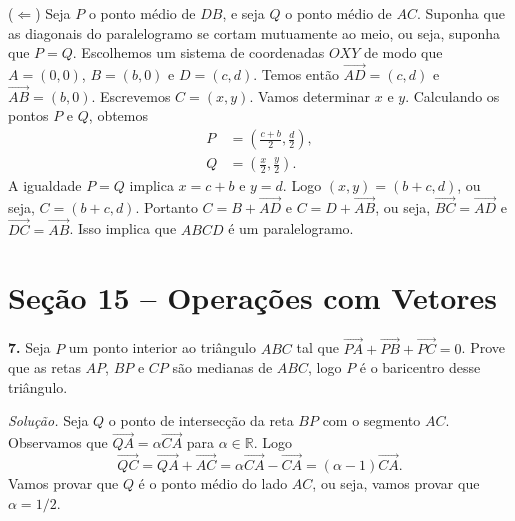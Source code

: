 \documentclass[a4paper,11pt]{article}
\newcommand{\R}{\mathbb{R}}
\begin{document}
($\Leftarrow$)
Seja $P$ o ponto médio de $DB$, e seja $Q$ o ponto médio de $AC$.
Suponha que as diagonais do paralelogramo se cortam mutuamente ao meio, ou seja, suponha que $P = Q$.
Escolhemos um sistema de coordenadas $OXY$ de modo que $A = (0,0)$, $B = (b,0)$ e $D = (c, d)$.
Temos então $\overrightarrow{AD} = (c,d)$ e $\overrightarrow{AB} = (b,0)$.
Escrevemos $C = (x,y)$.
Vamos determinar $x$ e $y$.
Calculando os pontos $P$ e $Q$, obtemos
\begin{align*}
  P & = \left( \frac{c+b}{2}, \frac{d}{2} \right), \\
  Q & = \left( \frac{x}{2}, \frac{y}{2} \right).
\end{align*}
A igualdade $P = Q$ implica $x = c + b$ e $y = d$.
Logo $(x,y) = (b + c, d)$, ou seja, $C = (b + c, d)$.
Portanto $C = B + \overrightarrow{AD}$ e $C = D + \overrightarrow{AB}$, ou seja, $\overrightarrow{BC} = \overrightarrow{AD}$ e $\overrightarrow{DC} = \overrightarrow{AB}$.
Isso implica que $ABCD$ é um paralelogramo.

\section*{Seção 15 -- Operações com Vetores}

\textbf{7.}
Seja $P$ um ponto interior ao triângulo $ABC$ tal que $\overrightarrow{PA} \!+\! \overrightarrow{PB} + \overrightarrow{PC} = 0$.
Prove que as retas $AP$, $BP$ e $CP$ são medianas de $ABC$, logo $P$ é o ba\-ri\-cen\-tro desse triângulo.

\vspace{\baselineskip}

\emph{Solução.}
Seja $Q$ o ponto de intersecção da reta $BP$ com o segmento $AC$.
Observamos que $\overrightarrow{QA} = \alpha \overrightarrow{CA}$ para $\alpha \in \R$.
Logo
\[
  \overrightarrow{QC} = \overrightarrow{QA} + \overrightarrow{AC} = \alpha \overrightarrow{CA} - \overrightarrow{CA} = (\alpha - 1) \overrightarrow{CA}.
\]
Vamos provar que $Q$ é o ponto médio do lado $AC$, ou seja, vamos provar que $\alpha = 1/2$.
\end{document}
